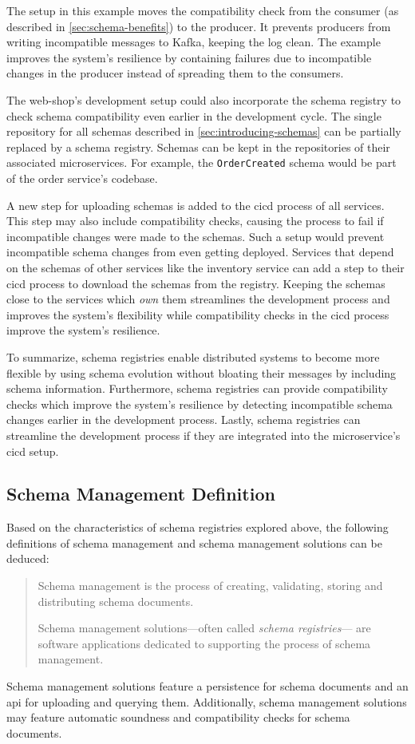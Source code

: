 The setup in this example moves the compatibility check from the consumer (as described in \ref{sec:schema-benefits}) to the producer.
It prevents producers from writing incompatible messages to Kafka, keeping the log clean.
The example improves the system's resilience by containing failures due to incompatible changes in the producer instead of spreading them to the consumers.

The web-shop's development setup could also incorporate the schema registry to check schema compatibility even earlier in the development cycle.
The single repository for all schemas described in \ref{sec:introducing-schemas} can be partially replaced by a schema registry.
Schemas can be kept in the repositories of their associated microservices.
For example, the \texttt{OrderCreated} schema would be part of the order service's codebase.

A new step for uploading schemas is added to the \gls{cicd} process of all services.
This step may also include compatibility checks, causing the process to fail if incompatible changes were made to the schemas.
Such a setup would prevent incompatible schema changes from even getting deployed.
Services that depend on the schemas of other services like the inventory service can add a step to their \gls{cicd} process to download the schemas from the registry.
Keeping the schemas close to the services which \emph{own} them streamlines the development process and improves the system's flexibility while compatibility checks in the \gls{cicd} process improve the system's resilience.

To summarize, schema registries enable distributed systems to become more flexible by using schema evolution without bloating their messages by including schema information.
Furthermore, schema registries can provide compatibility checks which improve the system's resilience by detecting incompatible schema changes earlier in the development process.
Lastly, schema registries can streamline the development process if they are integrated into the microservice's \gls{cicd} setup.

\subsection{Schema Management Definition}

Based on the characteristics of schema registries explored above, the following definitions of schema management and schema management solutions can be deduced:

\begin{quote}
  \centering
  Schema management is the process of creating, validating, storing and distributing schema documents.

  Schema management solutions---often called \emph{schema registries}--- are software applications dedicated to supporting the process of schema management.
\end{quote}

Schema management solutions feature a persistence for schema documents and an \gls{api} for uploading and querying them.
Additionally, schema management solutions may feature automatic soundness and compatibility checks for schema documents.
